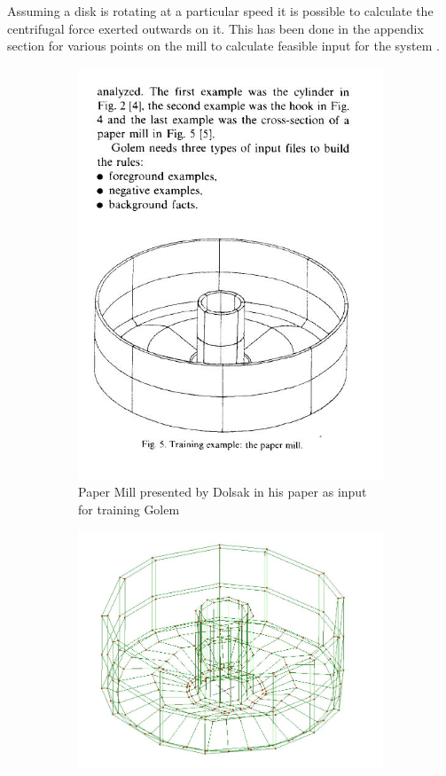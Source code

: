 Assuming a disk is rotating at a particular speed it is possible to calculate the centrifugal force exerted outwards on it. This has been done in the appendix section for various points on the mill to calculate feasible input for the system \cite{RotatingDiskFE}.



\begin{figure}[!h]
\centering
\begin{subfigure}{.5\textwidth}
  \centering
  \includegraphics[width=0.9\linewidth]{../Graphics/PaperMillDolsak.jpeg}
  \caption{Paper Mill presented by Dolsak in his paper as input for training Golem}
  \label{fig:sub1}
\end{subfigure}%
\begin{subfigure}{.5\textwidth}
  \centering
  \includegraphics[width=0.9\linewidth]{../Graphics/PaperMillWithinLisa.jpeg}

\end{subfigure}
\end{figure}
